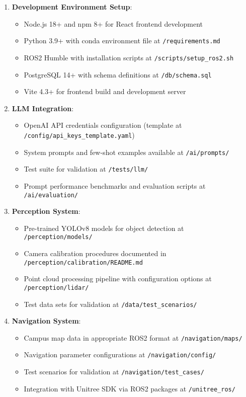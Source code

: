 \documentclass[12pt]{article}
\begin{document}
\begin{enumerate}
    \item \textbf{Development Environment Setup}:
    \begin{itemize}
        \item Node.js 18+ and npm 8+ for React frontend development
        \item Python 3.9+ with conda environment file at \texttt{/requirements.md}
        \item ROS2 Humble with installation scripts at \texttt{/scripts/setup\_ros2.sh}
        \item PostgreSQL 14+ with schema definitions at \texttt{/db/schema.sql}
        \item Vite 4.3+ for frontend build and development server
    \end{itemize}
    
    \item \textbf{LLM Integration}:
    \begin{itemize}
        \item OpenAI API credentials configuration (template at \texttt{/config/api\_keys\_template.yaml})
        \item System prompts and few-shot examples available at \texttt{/ai/prompts/}
        \item Test suite for validation at \texttt{/tests/llm/}
        \item Prompt performance benchmarks and evaluation scripts at \texttt{/ai/evaluation/}
    \end{itemize}
    
    \item \textbf{Perception System}:
    \begin{itemize}
        \item Pre-trained YOLOv8 models for object detection at \texttt{/perception/models/}
        \item Camera calibration procedures documented in \texttt{/perception/calibration/README.md}
        \item Point cloud processing pipeline with configuration options at \texttt{/perception/lidar/}
        \item Test data sets for validation at \texttt{/data/test\_scenarios/}
    \end{itemize}
    
    \item \textbf{Navigation System}:
    \begin{itemize}
        \item Campus map data in appropriate ROS2 format at \texttt{/navigation/maps/}
        \item Navigation parameter configurations at \texttt{/navigation/config/}
        \item Test scenarios for validation at \texttt{/navigation/test\_cases/}
        \item Integration with Unitree SDK via ROS2 packages at \texttt{/unitree\_ros/}
    \end{itemize}
    

\end{enumerate}
\end{document}
